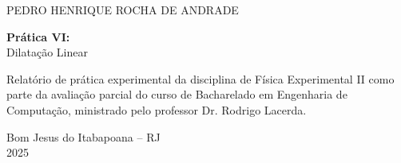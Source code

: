 \begin{center}
\thispagestyle{empty} 
    {\normalsize PEDRO HENRIQUE ROCHA DE ANDRADE}

    \vspace{5cm}

    {\Large\bfseries Prática VI: \\}
    {\normalsize Dilatação Linear}
    \vspace{6cm}

    \hspace{6cm}
\begin{flushright}
\begin{minipage}{0.55\textwidth}
    \singlespacing
    Relatório de prática experimental da disciplina de Física Experimental II como parte da avaliação parcial do curso de Bacharelado em Engenharia de Computação, ministrado pelo professor Dr. Rodrigo Lacerda.
\end{minipage}
\end{flushright}

    \vspace{6cm}

    {\normalsize Bom Jesus do Itabapoana -- RJ \\
    2025}

\end{center}